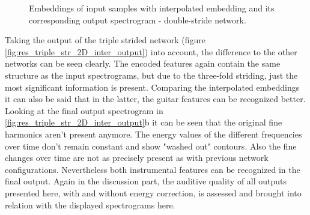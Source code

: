 \begin{figure}[htb!]
    \centering
    \captionsetup{justification=centering}
    \caption{Embeddings of input samples with interpolated embedding and its corresponding output spectrogram - double-stride network.}
    \label{fig:res_double_str_2D_inter_output}
\end{figure}

Taking the output of the triple strided network (figure \ref{fig:res_triple_str_2D_inter_output}) into account, the difference to the other networks can be seen clearly. The encoded features again contain the same structure as the input spectrograms, but due to the three-fold striding, just the most significant information is present. Comparing the interpolated embeddings it can also be said that in the latter, the guitar features can be recognized better. Looking at the final output spectrogram in \ref{fig:res_triple_str_2D_inter_output}b it can be seen that the original fine harmonics aren't present anymore. The energy values of the different frequencies over time don't remain constant and show "washed out" contours. Also the fine changes over time are not as precisely present as with previous network configurations. Nevertheless both instrumental features can be recognized in the final output. Again in the discussion part, the auditive quality of all outputs presented here, with and without energy correction, is assessed and brought into relation with the displayed spectrograms here.

